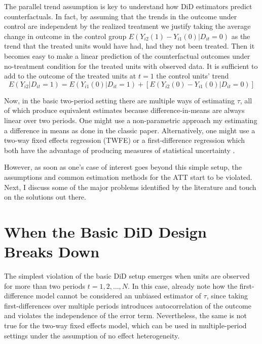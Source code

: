 \documentclass[hidelinks]{article}\usepackage[]{graphicx}\usepackage[]{color}
\begin{document}
The parallel trend assumption is key to understand how DiD estimators predict counterfactuals. In fact, by assuming that the trends in the outcome under control are independent by the realized treatment we justify taking the average change in outcome in the control group $E(Y_{i2} (1) - Y_{i1}(0) | D_{it} = 0)$ as the trend that the treated units would have had, had they not been treated. Then it becomes easy to make a linear prediction of the counterfactual outcomes under no-treatment condition for the treated units with observed data. It is sufficient to add to the outcome of the treated units at $t=1$ the control units' trend
$$ E(Y_{i2} | D_{it} = 1) = E(Y_{i1}(0) | D_{it} = 1) + \left[ E(Y_{i2} (0) - Y_{i1}(0) | D_{it} = 0) \right] $$

Now, in the basic two-period setting there are multiple ways of estimating $\tau$, all of which produce equivalent estimates because difference-in-means are always linear over two periods. One might use a non-parametric approach my estimating a difference in means as done in the classic \textcite{Card1990} paper. Alternatively, one might use a two-way fixed effects regression (TWFE) or a first-difference regression which both have the advantage of producing measures of statistical uncertainty \parencite{Angrist2009}.

However, as soon as one's case of interest goes beyond this simple setup, the assumptions and common estimation methods for the ATT start to be violated. Next, I discuss some of the major problems identified by the literature and touch on the solutions out there.

\section{When the Basic DiD Design Breaks Down}

The simplest violation of the basic DiD setup emerges when units are observed for more than two periods $t=1, 2, \dots, N$. In this case, \textcite{Angrist2009} already note how the first-difference model cannot be considered an unbiased estimator of $\tau$, since taking first-differences over multiple periods introduces autocorrelation of the outcome and violates the independence of the error term. Nevertheless, the same is not true for the two-way fixed effects model, which can be used in multiple-period settings under the assumption of no effect heterogeneity.
\end{document}
